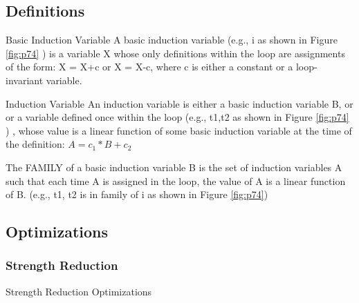 \subsection{Definitions}

\begin{definition}{Basic Induction Variable}
	A basic induction variable (e.g., i as shown in Figure \ref{fig:p74} ) is a variable X whose only definitions within the loop
	are assignments of the form: X = X+c or X = X-c, where c is either a constant or
	a loop-invariant variable.
\end{definition}

\begin{definition}{Induction Variable}
	An induction variable is either a basic induction variable B, or
	or a variable defined once within the loop (e.g., t1,t2 as shown in Figure \ref{fig:p74} ) , whose value is a linear function
	of some basic induction variable at the time of the definition:
	$A = c_1 * B + c_2$
\end{definition}

The FAMILY of a basic induction variable B is the set of induction variables A such that each time A is assigned in the loop,
the value of A is a linear function of B. (e.g., t1, t2 is in family of i as shown in Figure \ref{fig:p74})


\subsection{Optimizations}

\subsubsection{Strength Reduction}
\begin{algorithm}[H]
	\caption{Strength Reduction Optimizations}\label{alg:Strength Reduction Optimizations}
	\begin{algorithmic}


	\end{algorithmic}
\end{algorithm}

